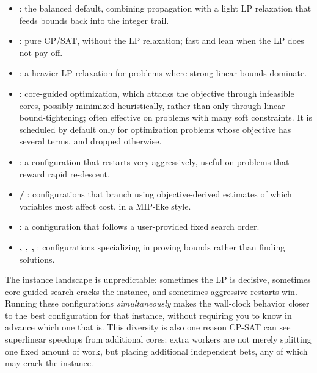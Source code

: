 \begin{itemize}
  \item \textbf{}: the balanced default, combining propagation
  with a light LP relaxation that feeds bounds back into the integer trail.
  \item \textbf{}: pure CP/SAT, without the LP relaxation; fast and
  lean when the LP does not pay off.
  \item \textbf{}: a heavier LP relaxation for problems where
  strong linear bounds dominate.
  \item \textbf{}: core-guided optimization, which attacks the
  objective through infeasible cores, possibly minimized heuristically, rather
  than only through linear bound-tightening; often effective on problems with
  many soft constraints. It is scheduled by default only for optimization
  problems whose objective has several terms, and dropped otherwise.
  \item \textbf{}: a configuration that restarts very
  aggressively, useful on problems that reward rapid re-descent.
  \item \textbf{ / }: configurations
  that branch using objective-derived estimates of which variables most affect
  cost, in a MIP-like style.
  \item \textbf{}: a configuration that follows a user-provided
  fixed search order.
  \item \textbf{, ,
  , }: configurations
  specializing in proving bounds rather than finding solutions.
\end{itemize}

The instance landscape is unpredictable: sometimes the LP is decisive, sometimes
core-guided search cracks the instance, and sometimes aggressive restarts win.
Running these configurations \emph{simultaneously} makes the wall-clock behavior
closer to the best configuration for that instance, without requiring you to know
in advance which one that is. This diversity is also one reason CP-SAT can see
superlinear speedups from additional cores: extra workers are not merely splitting
one fixed amount of work, but placing additional independent bets, any of which
may crack the instance.

